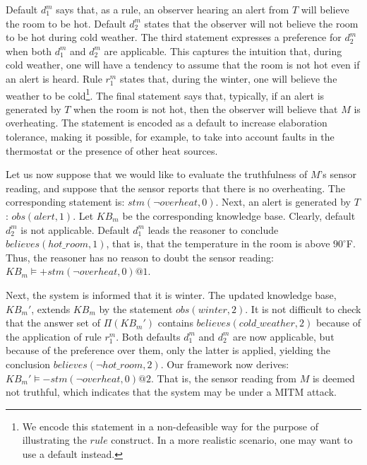\documentclass{article}
\begin{document}
Default $d_1^m$ says that, as a rule, an observer hearing an alert from $T$ will believe the room to be hot. Default $d_2^m$ states that the observer will not believe the room to be hot during cold weather. The third statement expresses a preference for $d_2^m$ when both $d_1^m$ and $d_2^m$ are applicable. This captures the intuition that, during cold weather,  one will have a tendency to assume that the room is not hot even if an alert is heard. Rule $r_1^m$ states that, during the winter, one will believe the weather to be cold\footnote{We encode this statement in a non-defeasible way for the purpose of illustrating the $rule$ construct. In a more realistic scenario, one may want to use a default instead.}. The final statement says that, typically, if an alert is generated by $T$ when the room is not hot, then the observer will believe that $M$ is overheating. The statement is encoded as a default to increase elaboration tolerance, making it possible, for example, to take into account faults in the thermostat or the presence of other heat sources.

Let us now suppose that we would like to evaluate the truthfulness of $M$'s sensor reading, and suppose that the sensor reports that there is no overheating. The corresponding statement is:
$stm(\neg overheat,0).$
Next, an alert is generated by $T$:
$
obs(alert,1).
$
Let $KB_m$ be the corresponding knowledge base. Clearly, default $d_2^m$ is not applicable. Default $d_1^m$ leads the reasoner to conclude $believes(hot\_room,1)$, that is, that the temperature in the room is above $90^\circ$F. Thus, the reasoner has no reason to doubt the sensor reading:
$
KB_{m} \models {+}stm(\neg overheat,0)@1.
$

Next, the system is informed that it is winter. The updated knowledge base, $KB_m'$, extends $KB_m$ by the statement
$
obs(winter,2).
$
It is not difficult to check that the answer set of $\Pi(KB_m')$ contains $believes(cold\_weather,2)$ because of the application of rule $r^m_1$. Both defaults $d^m_1$ and $d^m_2$ are now applicable, but because of the preference over them, only the latter is applied, yielding the conclusion $believes(\neg hot\_room,2)$. Our framework now derives:
$
KB_m' \models {-}stm(\neg overheat,0)@2.
$
That is, the sensor reading from $M$ is deemed not truthful, which indicates that the system may be under a MITM attack.

   
\end{document}
